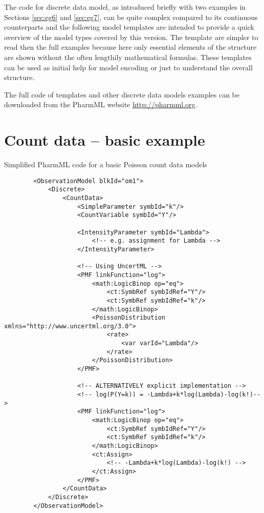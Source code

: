 The code for discrete data model, as introduced briefly with two examples in Sections 
\ref{sec:eg6} and \ref{sec:eg7}, can be quite complex compared to its continuous 
counterparts and the following model templates are intended to provide a quick 
overview of the model types covered by this \pharmml version. The template are 
simpler to read then the full examples because here only essential elements of 
the structure are shown without the often lengthily mathematical formulas. These 
templates can be used as initial help for model encoding or just to understand 
the overall structure. 

The full code of templates and other discrete data models examples can be 
downloaded from the PharmML website \url{http://pharmml.org}.

\section{Count data -- basic example}
Simplified PharmML code for a basic Poisson count data models
\lstset{language=XML}
\begin{lstlisting}
        <ObservationModel blkId="om1">
            <Discrete>
                <CountData>
                    <SimpleParameter symbId="k"/>
                    <CountVariable symbId="Y"/>

                    <IntensityParameter symbId="Lambda">
                        <!-- e.g. assignment for Lambda -->
                    </IntensityParameter>
                    
                    <!-- Using UncertML -->
                    <PMF linkFunction="log">
                        <math:LogicBinop op="eq">
                            <ct:SymbRef symbIdRef="Y"/>
                            <ct:SymbRef symbIdRef="k"/>
                        </math:LogicBinop>
                        <PoissonDistribution xmlns="http://www.uncertml.org/3.0">
                            <rate>
                                <var varId="Lambda"/>
                            </rate>
                        </PoissonDistribution>
                    </PMF>
                    
                    <!-- ALTERNATIVELY explicit implementation -->
                    <!-- log(P(Y=k)) = -Lambda+k*log(Lambda)-log(k!)-->
                    <PMF linkFunction="log">
                        <math:LogicBinop op="eq">
                            <ct:SymbRef symbIdRef="Y"/>
                            <ct:SymbRef symbIdRef="k"/>
                        </math:LogicBinop>
                        <ct:Assign>
                            <!-- -Lambda+k*log(Lambda)-log(k!) -->
                        </ct:Assign>
                    </PMF>
                </CountData>
            </Discrete>
        </ObservationModel>
\end{lstlisting}


